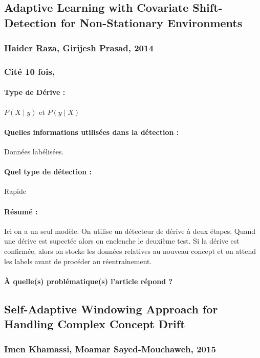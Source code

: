 \documentclass[11pt,a4paper]{report}
\begin{document}
\subsection{Adaptive Learning with Covariate Shift- Detection for Non-Stationary Environments}
\subsubsection{Haider Raza, Girijesh Prasad,  2014}

\subsubsection{Cité 10 fois, }

\paragraph{Type de Dérive :} $P(X\mid y)$ et $P(y \mid X)$ 
\paragraph{Quelles informations utilisées dans la détection :} Données labélisées.
\paragraph{Quel type de détection :} Rapide

\paragraph{Résumé :} Ici on a un seul modèle. On utilise un détecteur de dérive à deux étapes. Quand une dérive est supectée alors on enclenche le deuxième test. Si la dérive est confirmée, alors on stocke les données relatives au nouveau concept et on attend les labels avant de procéder au réentraînement.

\paragraph{À quelle(s) problématique(s) l'article répond ?} 






\subsection{Self-Adaptive Windowing Approach for Handling Complex Concept Drift}
\subsubsection{Imen Khamassi, Moamar Sayed-Mouchaweh,  2015}
\end{document}
